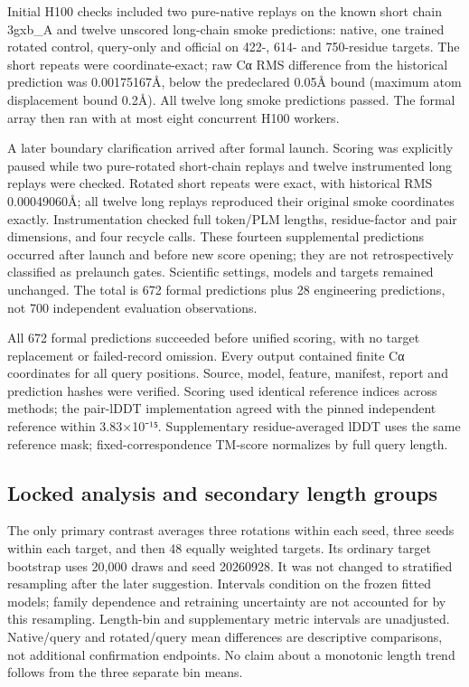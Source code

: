 Initial H100 checks included two pure-native replays on the known short
chain 3gxb\_A and twelve unscored long-chain smoke predictions: native, one trained
rotated control, query-only and official on 422-, 614- and 750-residue targets.
The short repeats were coordinate-exact; raw Cα RMS difference from the
historical prediction was 0.00175167Å, below the predeclared 0.05Å bound (maximum
atom displacement bound 0.2Å). All twelve long smoke predictions passed. The
formal array then ran with at most eight concurrent H100 workers.

A later boundary clarification arrived after formal launch. Scoring was explicitly
paused while two pure-rotated short-chain replays and twelve instrumented long
replays were checked. Rotated short repeats were exact, with historical RMS
0.00049060Å; all twelve long replays reproduced their original smoke coordinates
exactly. Instrumentation checked full token/PLM lengths, residue-factor and pair
dimensions, and four recycle calls. These fourteen supplemental predictions
occurred after launch and before new score opening; they are not retrospectively
classified as prelaunch gates. Scientific settings, models and targets remained
unchanged. The total is 672 formal predictions plus 28 engineering predictions,
not 700 independent evaluation observations.

All 672 formal predictions succeeded before unified scoring, with no target
replacement or failed-record omission. Every output contained finite Cα
coordinates for all query positions. Source, model, feature, manifest, report and
prediction hashes were verified. Scoring used identical reference indices across
methods; the pair-lDDT implementation agreed with the pinned independent reference
within 3.83×10⁻¹⁵. Supplementary residue-averaged lDDT uses the same reference mask;
fixed-correspondence TM-score normalizes by full query length.

\subsection{Locked analysis and secondary length groups}\label{locked-analysis-and-secondary-length-groups}

The only primary contrast averages three rotations within each seed, three seeds
within each target, and then 48 equally weighted targets. Its ordinary target
bootstrap uses 20,000 draws and seed 20260928. It was not changed to stratified
resampling after the later suggestion. Intervals condition on the frozen fitted
models; family dependence and retraining uncertainty are not accounted for by
this resampling. Length-bin and supplementary metric intervals are unadjusted.
Native/query and rotated/query mean differences are descriptive comparisons, not
additional confirmation endpoints. No claim about a monotonic length trend follows
from the three separate bin means.


